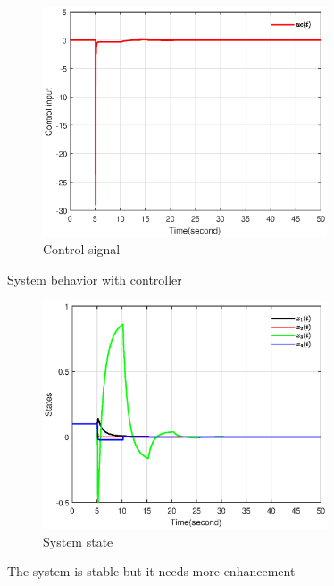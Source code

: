 \documentclass[dvipsnames,mathserif]{beamer}
\begin{document}
{\begin{frame}
      \begin{figure}[H]
        \centering
        \includegraphics[width=0.75\textwidth]{kuc.eps}
        \caption{Control signal }
        \label{fig3.3}
      \end{figure}
    \end{frame}
    \begin{frame}
      System behavior with controller
      \begin{figure}[H]
        \centering
        \includegraphics[width=0.75\textwidth]{kstates.eps}
        \caption{System state}
        \label{fig3.4}
      \end{figure}

      The system is stable but it needs more enhancement
    \end{frame}


}
\end{document}
